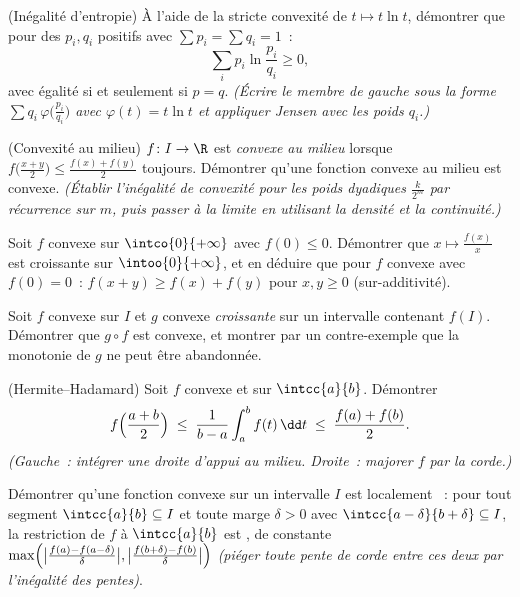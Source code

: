 \begin{exercise}[$\star\star$]\label{exo:b2:realfun:7}
(Inégalité d'entropie) À l'aide de la stricte convexité de $t \mapsto
t\ln t$, démontrer que pour des $p_i, q_i$ positifs avec $\sum p_i =
\sum q_i = 1$~:
\[
\sum_i p_i \ln\frac{p_i}{q_i} \geq 0 ,
\]
avec égalité si et seulement si $p = q$. \emph{(Écrire le membre de
gauche sous la forme $\sum q_i\, \varphi\bigl(\frac{p_i}{q_i}\bigr)$
avec $\varphi(t) = t\ln t$ et appliquer Jensen avec les poids
$q_i$.)}
\end{exercise}

\begin{exercise}[$\star\star\star$]\label{exo:b2:realfun:8}
(Convexité au milieu) $f \colon I \to \R$ est \emph{convexe au milieu}
lorsque $f\bigl(\frac{x+y}{2}\bigr) \leq \frac{f(x) + f(y)}{2}$
toujours. Démontrer qu'une fonction \emph{} convexe au milieu
est convexe. \emph{(Établir l'inégalité de convexité pour les poids
dyadiques $\frac{k}{2^m}$ par récurrence sur $m$, puis passer à la
limite en utilisant la densité et la continuité.)}
\end{exercise}

\begin{exercise}[$\star\star\star$]\label{exo:b2:realfun:9}
Soit $f$ convexe sur $\intco{0}{+\infty}$ avec $f(0) \leq 0$.
Démontrer que $x \mapsto \frac{f(x)}{x}$ est croissante sur
$\intoo{0}{+\infty}$, et en déduire que pour $f$ convexe avec $f(0) =
0$~: $f(x + y) \geq f(x) + f(y)$ pour $x, y \geq 0$
(sur-additivité).
\end{exercise}

\begin{exercise}[$\star$]\label{exo:b2:realfun:10}
Soit $f$ convexe sur $I$ et $g$ convexe \emph{croissante} sur un
intervalle contenant $f(I)$. Démontrer que $g \circ f$ est convexe,
et montrer par un contre-exemple que la monotonie de $g$ ne peut être
abandonnée.
\end{exercise}

\begin{exercise}[$\star\star$]\label{exo:b2:realfun:11}
(Hermite--Hadamard) Soit $f$ convexe et  sur
$\intcc{a}{b}$. Démontrer
\[
f\Bigl(\frac{a+b}{2}\Bigr) \;\leq\; \frac{1}{b -
a}\int_a^b f(t)\,\dd t \;\leq\; \frac{f(a) + f(b)}{2} .
\]
\emph{(Gauche~: intégrer une droite d'appui au milieu. Droite~:
majorer $f$ par la corde.)}
\end{exercise}

\begin{exercise}[$\star\star\star$]\label{exo:b2:realfun:12}
Démontrer qu'une fonction convexe sur un intervalle \emph{} $I$
est localement ~: pour tout segment $\intcc{a}{b}
\subseteq I$ et toute marge $\delta > 0$ avec $\intcc{a - \delta}{b +
\delta} \subseteq I$, la restriction de $f$ à $\intcc{a}{b}$ est
, de constante
$\max\Bigl(\bigl|\frac{f(a) - f(a - \delta)}{\delta}\bigr|,
\bigl|\frac{f(b + \delta) - f(b)}{\delta}\bigr|\Bigr)$
\emph{(piéger toute pente de corde entre ces deux par l'inégalité des
pentes)}.
\end{exercise}

